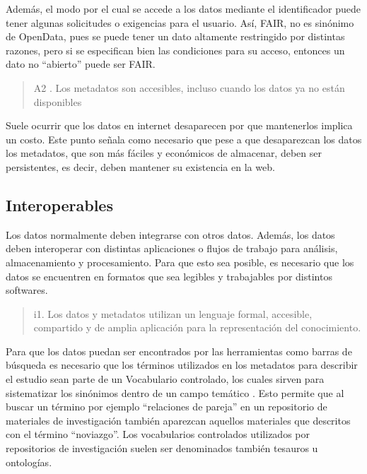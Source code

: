 \documentclass[
  14pt,
]{book}
\begin{document}
Además, el modo por el cual se accede a los datos mediante el identificador puede tener algunas solicitudes o exigencias para el usuario. Así, FAIR, no es sinónimo de OpenData, pues se puede tener un dato altamente restringido por distintas razones, pero si se especifican bien las condiciones para su acceso, entonces un dato no ``abierto'' puede ser FAIR.

\begin{quote}
A2 . Los metadatos son accesibles, incluso cuando los datos ya no están disponibles
\end{quote}

Suele ocurrir que los datos en internet desaparecen por que mantenerlos implica un costo. Este punto señala como necesario que pese a que desaparezcan los datos los metadatos, que son más fáciles y económicos de almacenar, deben ser persistentes, es decir, deben mantener su existencia en la web.

\hypertarget{interoperables}{%
\subsection{\texorpdfstring{\textbf{Interoperables}}{Interoperables}}\label{interoperables}}

Los datos normalmente deben integrarse con otros datos. Además, los datos deben interoperar con distintas aplicaciones o flujos de trabajo para análisis, almacenamiento y procesamiento. Para que esto sea posible, es necesario que los datos se encuentren en formatos que sea legibles y trabajables por distintos softwares.

\begin{quote}
i1. Los datos y metadatos utilizan un lenguaje formal, accesible, compartido y de amplia aplicación para la representación del conocimiento.
\end{quote}

Para que los datos puedan ser encontrados por las herramientas como barras de búsqueda es necesario que los términos utilizados en los metadatos para describir el estudio sean parte de un Vocabulario controlado, los cuales sirven para sistematizar los sinónimos dentro de un campo temático \citep{collins_Social_2015}. Esto permite que al buscar un término por ejemplo ``relaciones de pareja'' en un repositorio de materiales de investigación también aparezcan aquellos materiales que descritos con el término ``noviazgo''. Los vocabularios controlados utilizados por repositorios de investigación suelen ser denominados también tesauros u ontologías.
\end{document}
